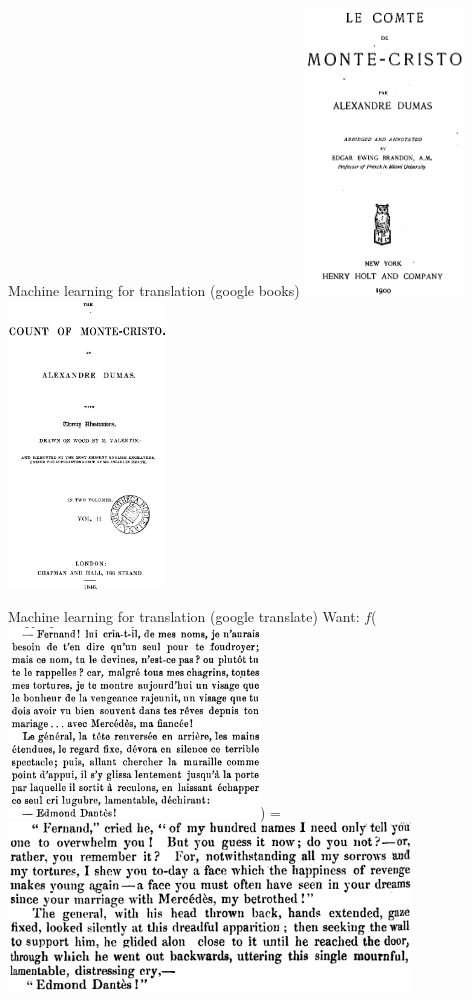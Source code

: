 \documentclass{article}
\begin{document}
{Machine learning for translation (google books)}
\includegraphics[height=3in]{translation/monte-cristo-french-title}
\includegraphics[height=3in]{translation/monte-cristo-english-title}

{Machine learning for translation (google translate)}
Want: $f$(\includegraphics[width=0.5\textwidth]{translation/monte-cristo-french}) =
\includegraphics[width=0.8\textwidth]{translation/monte-cristo-english}
\end{document}
